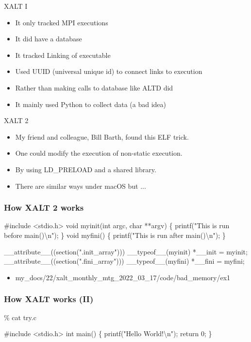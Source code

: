 \documentclass{beamer}
\begin{document}
\begin{frame}{XALT I}
  \begin{itemize}
    \item It only tracked MPI executions
    \item It did have a database
    \item It tracked Linking of executable
    \item Used UUID (universal unique id) to connect links to execution
    \item Rather than making calls to database like ALTD did
    \item It mainly used Python to collect data (a bad idea)
  \end{itemize}
\end{frame}


\begin{frame}{XALT 2}
  \begin{itemize}
    \item My friend and colleague, Bill Barth, found this ELF trick.
    \item One could modify the execution of non-static execution.
    \item By using LD\_PRELOAD and a shared library.
    \item There are similar ways under macOS but ...
  \end{itemize}
\end{frame}

\begin{frame}[fragile]
    \frametitle{How XALT 2 works}
 {\tiny
    \begin{semiverbatim}
#include <stdio.h>
void myinit(int argc, char **argv)
\{ printf("This is run before main()\textbackslash{}n"); \}
void myfini()
\{ printf("This is run after main()\textbackslash{}n"); \}

__attribute__((section(".init_array"))) __typeof__(myinit) *__init = myinit;
__attribute__((section(".fini_array"))) __typeof__(myfini) *__fini = myfini;
    \end{semiverbatim}
}
  \begin{itemize}
    \item my\_docs/22/xalt\_monthly\_mtg\_2022\_03\_17/code/bad\_memory/ex1
  \end{itemize}
\end{frame}

\begin{frame}[fragile]
    \frametitle{How XALT works (II)}
 {\small
    \begin{semiverbatim}
\% cat try.c

#include <stdio.h>
int main()
\{
  printf("Hello World!\textbackslash{}n");
  return 0;
\}

    \end{semiverbatim}
}
\end{frame}
\end{document}

